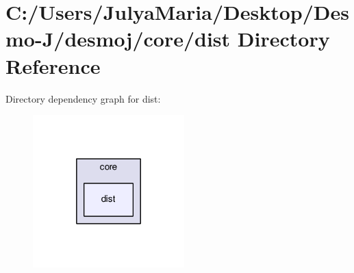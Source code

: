 \section{C\-:/\-Users/\-Julya\-Maria/\-Desktop/\-Desmo-\/\-J/desmoj/core/dist Directory Reference}
\label{dir_a551d2aa79309afdafd1c72be7f9c7ee}
Directory dependency graph for dist\-:
\nopagebreak
\begin{figure}[H]
\begin{center}
\leavevmode
\includegraphics[width=166pt]{dir_a551d2aa79309afdafd1c72be7f9c7ee_dep}
\end{center}
\end{figure}
